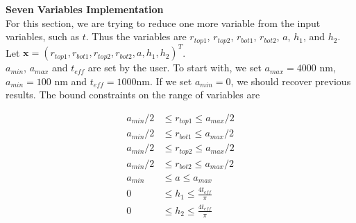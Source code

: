 \documentclass[12pt]{article}
\numberwithin{equation}{section}
\numberwithin{equation}{section}
\begin{document}
\begin{outline}[enumerate]
\1 \textbf{Seven Variables Implementation} \\
For this section, we are trying to reduce one more variable from the input variables, such as $t$.  
Thus the variables are $r_{top1}$, $r_{top2}$, $r_{bot1}$, $r_{bot2}$, $a$, $h_1$, and $h_2$. \\
Let $\mathbf{x} = \left ( r_{top1}, r_{bot1}, r_{top2}, r_{bot2}, a, h_1, h_2  \right )^T $. \\
$a_{min}$, $a_{max}$ and $t_{eff}$ are set by the user.   To start with, we set $a_{max} = 4000$ nm, $a_{min} = 100$ nm and $t_{eff} = 1000$nm.  If we set $a_{min} = 0$, we should recover previous results.
The bound constraints on the range of variables are

\begin{align*}
a_{min}/2 & \leq r_{top1} \leq a_{max}/2 \\
a_{min}/2 & \leq r_{bot1} \leq a_{max}/2 \\
a_{min}/2 & \leq r_{top2} \leq a_{max}/2 \\
a_{min}/2 & \leq r_{bot2} \leq a_{max}/2 \\
a_{min} & \leq a \leq a_{max} \\
0 & \leq h_1 \leq \frac{4 t_{eff}}{\pi}  \\
0 & \leq h_2 \leq \frac{4 t_{eff}}{\pi}
\end{align*}


\end{outline}
\end{document}
